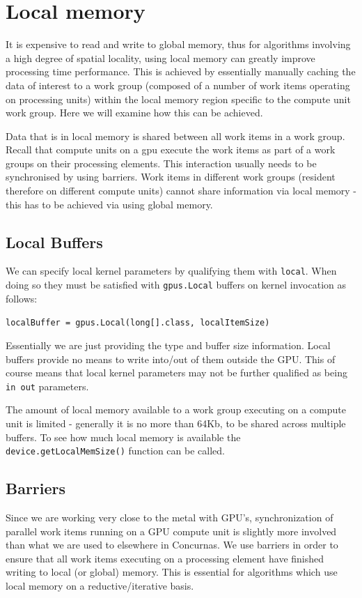 \documentclass[conc-doc]{subfiles}
\begin{document}
\section{Local memory}
It is expensive to read and write to global memory, thus for algorithms involving a  high degree of spatial locality, using local memory can greatly improve processing time performance. This is achieved by essentially manually caching the data of interest to a work group (composed of a number of work items operating on processing units) within the local memory region specific to the compute unit work group. Here we will examine how this can be achieved.

Data that is in local memory is shared between all work items in a work group. Recall that compute units on a gpu execute the work items as part of a work groups on their processing elements. This interaction usually needs to be synchronised by using barriers. Work items in different work groups (resident therefore on different compute units) cannot share information via local memory - this has to be achieved via using global memory.

\subsection{Local Buffers}
We can specify local kernel parameters by qualifying them with \lstinline{local}. When doing so they must be satisfied with \lstinline{gpus.Local} buffers on kernel invocation as follows:
\begin{center}
	\lstinline{localBuffer = gpus.Local(long[].class, localItemSize)}
\end{center}

Essentially we are just providing the type and buffer size information. Local buffers provide no means to write into/out of them outside the GPU. This of course means that local kernel parameters may not be further qualified as being \lstinline{in out} parameters.

The amount of local memory available to a work group executing on a compute unit is limited - generally it is no more than 64Kb, to be shared across multiple buffers. To see how much local memory is available the \lstinline{device.getLocalMemSize()} function can be called.

\subsection{Barriers}
Since we are working very close to the metal with GPU's, synchronization of parallel work items running on a GPU compute unit is slightly more involved than what we are used to elsewhere in Concurnas. We use barriers in order to ensure that all work items executing on a processing element have finished writing to local (or global) memory. This is essential for algorithms which use local memory on a reductive/iterative basis.
\end{document}
